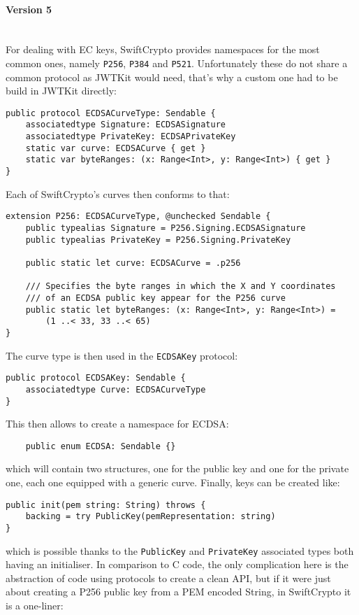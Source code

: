 \paragraph{Version 5} \mbox{} \\
For dealing with EC keys, SwiftCrypto provides namespaces for the most common ones, namely \lstinline{P256}, \lstinline{P384} and \lstinline{P521}. Unfortunately these do not share a common protocol as JWTKit would need, that's why a custom one had to be build in JWTKit directly:
\begin{verbatim}
public protocol ECDSACurveType: Sendable {
    associatedtype Signature: ECDSASignature
    associatedtype PrivateKey: ECDSAPrivateKey
    static var curve: ECDSACurve { get }
    static var byteRanges: (x: Range<Int>, y: Range<Int>) { get }
}
\end{verbatim}
Each of SwiftCrypto's curves then conforms to that:
\begin{verbatim}
extension P256: ECDSACurveType, @unchecked Sendable {
    public typealias Signature = P256.Signing.ECDSASignature
    public typealias PrivateKey = P256.Signing.PrivateKey

    public static let curve: ECDSACurve = .p256

    /// Specifies the byte ranges in which the X and Y coordinates 
    /// of an ECDSA public key appear for the P256 curve
    public static let byteRanges: (x: Range<Int>, y: Range<Int>) = 
        (1 ..< 33, 33 ..< 65)
}
\end{verbatim}
The curve type is then used in the \lstinline{ECDSAKey} protocol:
\begin{verbatim}
public protocol ECDSAKey: Sendable {
    associatedtype Curve: ECDSACurveType
}
\end{verbatim}
This then allows to create a namespace for ECDSA:
\begin{verbatim}
    public enum ECDSA: Sendable {}
\end{verbatim}
which will contain two structures, one for the public key and one for the private one, each one equipped with a generic curve.
Finally, keys can be created like:
\begin{verbatim}
public init(pem string: String) throws {
    backing = try PublicKey(pemRepresentation: string)
}
\end{verbatim}
which is possible thanks to the \lstinline{PublicKey} and \lstinline{PrivateKey} associated types both having an  initialiser. In comparison to C code, the only complication here is the abstraction of code using protocols to create a clean API, but if it were just about creating a P256 public key from a PEM encoded String, in SwiftCrypto it is a one-liner:
